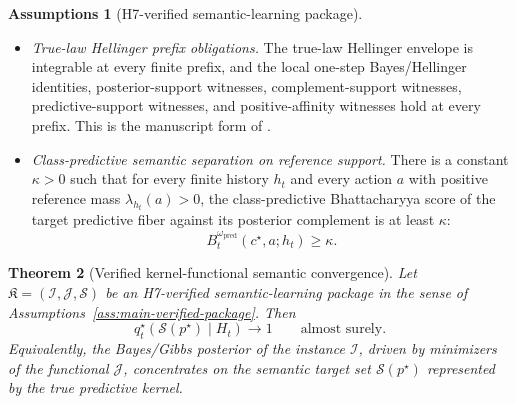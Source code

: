 \documentclass[11pt]{article}
\newtheorem{theorem}{Theorem}[section]
\theoremstyle{definition}
\newtheorem{assumptions}[theorem]{Assumptions}
\theoremstyle{remark}
\newcommand{\Scal}{\mathcal{S}}
\begin{document}
\begin{assumptions}[H7-verified semantic-learning package]
\begin{itemize}
\[
0<
q_t^\star(c^\star\mid h_t)
\qquad\text{and}\qquad
q_t^\star(c^\star\mid h_t)<\infty
\]
in the extended-real normalizer sense used by the Lean development.
\item[(M6)] \emph{True-law Hellinger prefix obligations.} The true-law Hellinger envelope is integrable at every finite prefix, and the local one-step Bayes/Hellinger identities, posterior-support witnesses, complement-support witnesses, predictive-support witnesses, and positive-affinity witnesses hold at every prefix. This is the manuscript form of .
\item[(M7)] \emph{Class-predictive semantic separation on reference support.} There is a constant $\kappa>0$ such that for every finite history $h_t$ and every action $a$ with positive reference mass $\lambda_{h_t}(a)>0$, the class-predictive Bhattacharyya score of the target predictive fiber against its posterior complement is at least $\kappa$:
\[
B_t^{\omega_{\mathrm{pred}}}(c^\star,a;h_t)\ge \kappa.
\]
\end{itemize}
\end{assumptions}

\begin{theorem}[Verified kernel-functional semantic convergence]
\label{thm:separating-support-convergence}
Let $\mathfrak K=(\mathcal I,\mathcal J,\Scal)$ be an H7-verified semantic-learning package in the sense of Assumptions~\ref{ass:main-verified-package}. Then
\[
q_t^\star(\Scal(p^\star)\mid H_t)\longrightarrow 1
\qquad
\text{almost surely.}
\]
Equivalently, the Bayes/Gibbs posterior of the instance $\mathcal I$, driven by minimizers of the functional $\mathcal J$, concentrates on the semantic target set $\Scal(p^\star)$ represented by the true predictive kernel.
\end{theorem}
\end{document}
